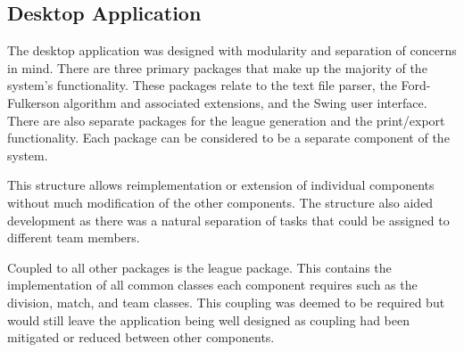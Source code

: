 \subsection{Desktop Application}

The desktop application was designed with modularity and separation of concerns
in mind. There are three primary packages that make up the majority of the 
system's functionality. These packages relate to the text file parser,
the Ford-Fulkerson algorithm and associated extensions, and the Swing user
interface. There are also separate packages for the league generation and the 
print/export functionality. Each package can be considered to be a separate
component of the system.

This structure allows reimplementation or extension of individual components 
without much modification of the other components. The structure also aided
development as there was a natural separation of tasks that could be assigned
to different team members.

Coupled to all other packages is the league package. This contains the
implementation of all common classes each component requires such as the
division, match, and team classes. This coupling was deemed to be required
but would still leave the application being well designed as coupling had been
mitigated or reduced between other components.
